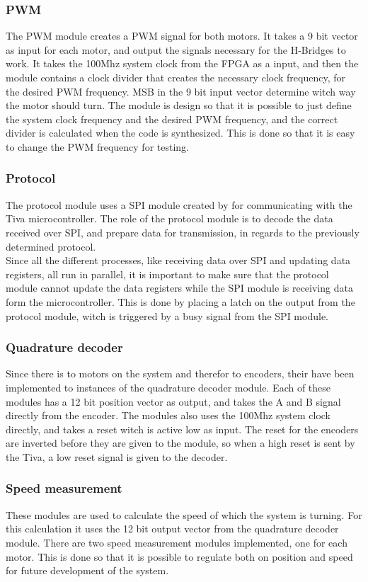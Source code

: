 \documentclass[../../../main]{subfiles}
\begin{document}
\subsubsection{PWM}
The PWM module creates a PWM signal for both motors. It takes a 9 bit vector as input for each motor, and output the signals necessary for the H-Bridges to work.
It takes the 100Mhz system clock from the FPGA as a input, and then the module contains a clock divider that creates the necessary clock frequency, for the desired PWM frequency.
MSB in the 9 bit input vector determine witch way the motor should turn.
The module is design so that it is possible to just define the system clock frequency and the desired PWM frequency, and the correct divider is calculated when the code is synthesized.
This is done so that it is easy to change the PWM frequency for testing.
\subsubsection{Protocol}
The protocol module uses a SPI module created by  for communicating with the Tiva microcontroller.
The role of the protocol module is to decode the data received over SPI, and prepare data for transmission, in regards to the previously determined protocol.
\\
Since all the different processes, like receiving data over SPI and updating data registers, all run in parallel, it is important to make sure that the protocol module cannot update the data registers while the SPI module is receiving data form the microcontroller.
This is done by placing a latch on the output from the protocol module, witch is triggered by a busy signal from the SPI module.

\subsubsection{Quadrature decoder}
Since there is to motors on the system and therefor to encoders, their have been implemented to instances of the quadrature decoder module.
Each of these modules has a 12 bit position vector as output, and takes the A and B signal directly from the encoder. The modules also uses the 100Mhz system clock directly, and takes a reset witch is active low as input.
The reset for the encoders are inverted before they are given to the module, so when a high reset is sent by the Tiva, a low reset signal is given to the decoder.


\subsubsection{Speed measurement}
These modules are used to calculate the speed of which the system is turning. For this calculation it uses the 12 bit output vector from the quadrature decoder module.
There are two speed measurement modules implemented, one for each motor.
This is done so that it is possible to regulate both on position and speed for future development of the system.
\end{document}
